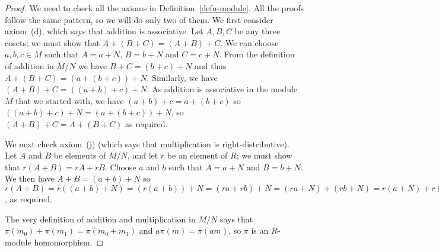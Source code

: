 \documentclass{amsart}
\renewcommand{\:}{\colon}
\theoremstyle{definition}
\begin{document}
\begin{proof}
 We need to check all the axioms in Definition~\ref{defn-module}.  All
 the proofs follow the same pattern, so we will do only two of them.
 We first consider axiom~(d), which says that addition is
 associative.  Let $A,B,C$ be any three cosets; we must show that
 $A+(B+C)=(A+B)+C$.  We can choose $a,b,c\in M$ such that $A=a+N$,
 $B=b+N$ and $C=c+N$.  From the definition of addition in $M/N$ we
 have $B+C=(b+c)+N$ and thus $A+(B+C)=(a+(b+c))+N$.  Similarly, we
 have $(A+B)+C=((a+b)+c)+N$.  As addition is associative in the module
 $M$ that we started with, we have $(a+b)+c=a+(b+c)$ so
 $((a+b)+c)+N=(a+(b+c))+N$, so $(A+B)+C=A+(B+C)$ as required.

 We next check axiom~(j) (which says that multiplication is
 right-distributive).  Let $A$ and $B$ be elements of $M/N$, and let
 $r$ be an element of $R$; we must show that $r(A+B)=rA+rB$.  Choose
 $a$ and $b$ such that $A=a+N$ and $B=b+N$.  We then have
 $A+B=(a+b)+N$ so
 $r(A+B)=r((a+b)+N)=(r(a+b))+N=(ra+rb)+N=
  (ra+N)+(rb+N)=r(a+N)+r(b+N)=rA+rB$, as required.

 The very definition of addition and multiplication in $M/N$ says that
 $\pi(m_0)+\pi(m_1)=\pi(m_0+m_1)$ and $a\pi(m)=\pi(am)$, so $\pi$ is
 an $R$-module homomorphism.
\end{proof}
\end{document}
